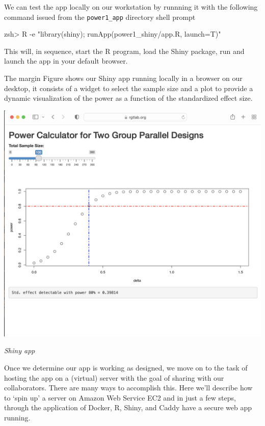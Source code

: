 \documentclass[
  letterpaper,
  DIV=11,
  numbers=noendperiod,
  oneside]{scrartcl}
\newenvironment{Shaded}{\begin{snugshade}}{\end{snugshade}}
\newcommand{\AttributeTok}[1]{\textcolor[rgb]{0.40,0.45,0.13}{#1}}
\newcommand{\FunctionTok}[1]{\textcolor[rgb]{0.28,0.35,0.67}{#1}}
\newcommand{\NormalTok}[1]{\textcolor[rgb]{0.00,0.23,0.31}{#1}}
\newcommand{\OperatorTok}[1]{\textcolor[rgb]{0.37,0.37,0.37}{#1}}
\newcommand{\StringTok}[1]{\textcolor[rgb]{0.13,0.47,0.30}{#1}}
\begin{document}
We can test the app locally on our workstation by runnning it with the
following command issued from the \texttt{power1\_app} directory shell
prompt

\begin{Shaded}
\begin{Highlighting}[]
\FunctionTok{zsh}\OperatorTok{\textgreater{}}\NormalTok{ R }\AttributeTok{{-}e} \StringTok{"library(shiny); runApp(\textquotesingle{}power1\_shiny/app.R\textquotesingle{}, launch=T)"}
\end{Highlighting}
\end{Shaded}

This will, in sequence, start the R program, load the Shiny package, run
and launch the app in your default browser.

The margin Figure shows our Shiny app running locally in a browser on
our desktop, it consists of a widget to select the sample size and a
plot to provide a dynamic visualization of the power as a function of
the standardized effect size.

\begin{marginfigure}

{\centering \includegraphics{img/shinyapppower1.png}

}

\caption{\emph{Shiny app}}

\end{marginfigure}

Once we determine our app is working as designed, we move on to the task
of hosting the app on a (virtual) server with the goal of sharing with
our collaborators. There are many ways to accomplish this. Here we'll
describe how to `spin up' a server on Amazon Web Service EC2 and in just
a few steps, through the application of Docker, R, Shiny, and Caddy have
a secure web app running.
\end{document}
